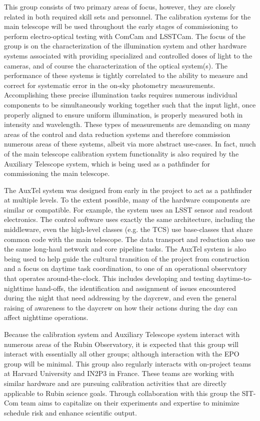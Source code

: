 \documentclass[SE,toc]{lsstdoc}
\begin{document}
This group consists of two primary areas of focus, however, they are closely related in both required skill sets and personnel.
The calibration systems for the main telescope will be used throughout the early stages of commissioning to perform electro-optical testing with ComCam and LSSTCam.
The focus of the group is on the characterization of the illumination system and other hardware systems associated with providing specialized and controlled doses of light to the cameras, and of course the characterization of the optical system(s).
The performance of these systems is tightly correlated to the ability to measure and correct for systematic error in the on-sky photometry measurements.
Accomplishing these precise illumination tasks requires numerous individual components to be simultaneously working together such that the input light, once properly aligned to ensure uniform illumination, is properly measured both in intensity and wavelength.
These types of measurements are demanding on many areas of the control and data reduction systems and therefore commission numerous areas of these systems, albeit via more abstract use-cases.
In fact, much of the main telescope calibration system functionality is also required by the Auxiliary Telescope system, which is being used as a pathfinder for commissioning the main telescope.

The AuxTel system was designed from early in the project to act as a pathfinder at multiple levels.
To the extent possible, many of the hardware components are similar or compatible.
For example, the system uses an LSST sensor and readout electronics. The control software uses exactly the same architecture, including the middleware, even the high-level classes (e.g. the TCS) use base-classes that share common code with the main telescope.
The data transport and reduction also use the same long-haul network and core pipeline tasks.
The AuxTel system is also being used to help guide the cultural transition of the project from construction and a focus on daytime task coordination, to one of an operational observatory that operates around-the-clock.
This includes developing and testing daytime-to-nighttime hand-offs, the identification and assignment of issues encountered during the night that need addressing by the daycrew, and even the general raising of awareness to the daycrew on how their actions during the day can affect nighttime operations.

Because the calibration system and Auxiliary Telescope system interact with numerous areas of the Rubin Observatory, it is expected that this group will interact with essentially all other groups; although interaction with the EPO group will be minimal.
This group also regularly interacts with on-project teams at Harvard University and IN2P3 in France.
These teams are working with similar hardware and are pursuing calibration activities that are directly applicable to Rubin science goals.
Through collaboration with this group the SIT-Com team aims to capitalize on their experiments and expertise to minimize schedule risk and enhance scientific output.
\end{document}
